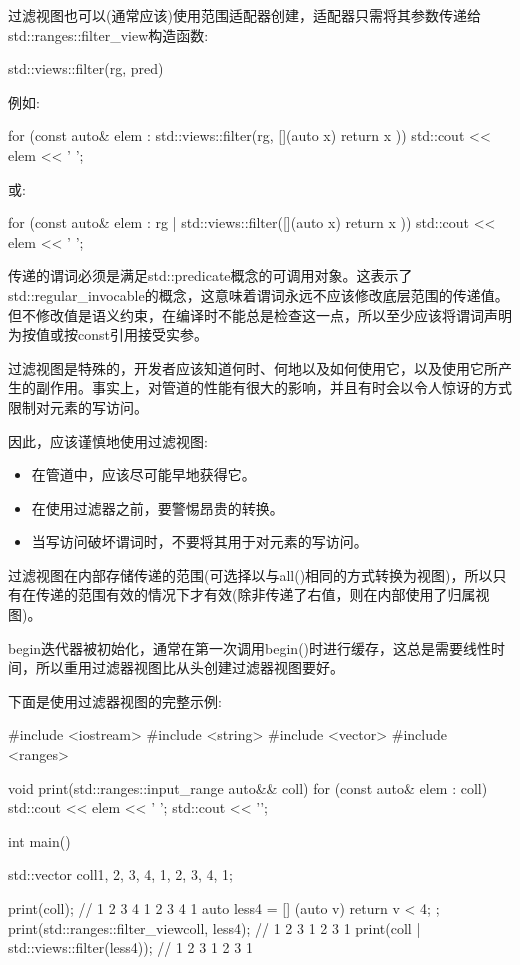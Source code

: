 
过滤视图也可以(通常应该)使用范围适配器创建，适配器只需将其参数传递给std::ranges::filter\_view构造函数:

\begin{cpp}
std::views::filter(rg, pred)
\end{cpp}

例如:

\begin{cpp}
for (const auto& elem : std::views::filter(rg, [](auto x) {
						return x %
					})) {
	std::cout << elem << ' ';
}
\end{cpp}

或:

\begin{cpp}
for (const auto& elem : rg | std::views::filter([](auto x) {
						return x %
					})) {
	std::cout << elem << ' ';
}
\end{cpp}

传递的谓词必须是满足std::predicate概念的可调用对象。这表示了std::regular\_invocable的概念，这意味着谓词永远不应该修改底层范围的传递值。但不修改值是语义约束，在编译时不能总是检查这一点，所以至少应该将谓词声明为按值或按const引用接受实参。

过滤视图是特殊的，开发者应该知道何时、何地以及如何使用它，以及使用它所产生的副作用。事实上，对管道的性能有很大的影响，并且有时会以令人惊讶的方式限制对元素的写访问。

因此，应该谨慎地使用过滤视图:

\begin{itemize}
\item
在管道中，应该尽可能早地获得它。

\item
在使用过滤器之前，要警惕昂贵的转换。

\item
当写访问破坏谓词时，不要将其用于对元素的写访问。
\end{itemize}

过滤视图在内部存储传递的范围(可选择以与all()相同的方式转换为视图)，所以只有在传递的范围有效的情况下才有效(除非传递了右值，则在内部使用了归属视图)。

begin迭代器被初始化，通常在第一次调用begin()时进行缓存，这总是需要线性时间，所以重用过滤器视图比从头创建过滤器视图要好。

下面是使用过滤器视图的完整示例:


\begin{cpp}
#include <iostream>
#include <string>
#include <vector>
#include <ranges>

void print(std::ranges::input_range auto&& coll)
{
	for (const auto& elem : coll) {
		std::cout << elem << ' ';
	}
	std::cout << '\n';
}

int main()
{
	std::vector coll{1, 2, 3, 4, 1, 2, 3, 4, 1};
	
	print(coll); // 1 2 3 4 1 2 3 4 1
	auto less4 = [] (auto v) { return v < 4; };
	print(std::ranges::filter_view{coll, less4}); // 1 2 3 1 2 3 1
	print(coll | std::views::filter(less4)); // 1 2 3 1 2 3 1
}
\end{cpp}

